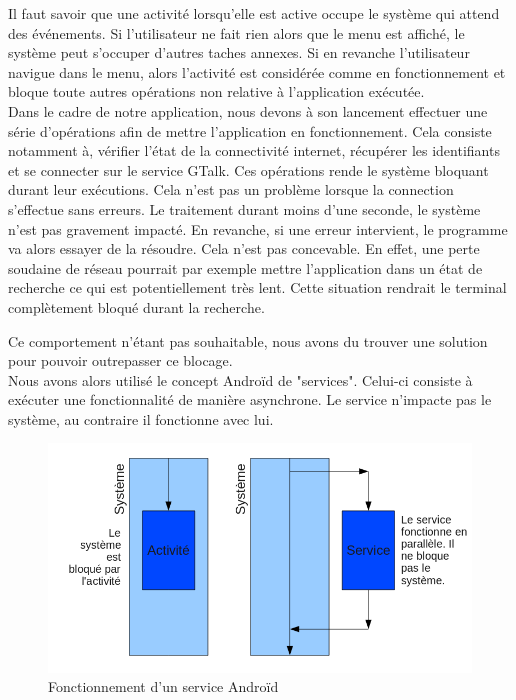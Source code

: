 Il faut savoir que une activité lorsqu'elle est active occupe le système qui attend des événements.
Si l'utilisateur ne fait rien alors que le menu est affiché, le système peut s'occuper d'autres 
taches annexes. Si en revanche l'utilisateur navigue dans le menu, alors l'activité est considérée
comme en fonctionnement et bloque toute autres opérations non relative à l'application exécutée.
\\


Dans le cadre de notre application, nous devons à son lancement effectuer une série d'opérations 
afin de mettre l'application en fonctionnement. Cela consiste notamment à, vérifier l'état de la 
connectivité internet, récupérer les identifiants et se connecter sur le service GTalk. Ces 
opérations rende le système bloquant durant leur exécutions. Cela n'est pas un problème lorsque la 
connection s'effectue sans erreurs. Le traitement durant moins d'une seconde, le système n'est pas
gravement impacté. En revanche, si une erreur intervient, le programme va alors essayer de la résoudre.
Cela n'est pas concevable. En effet, une perte soudaine de réseau pourrait par exemple mettre 
l'application dans un état de recherche ce qui est potentiellement très lent. Cette situation rendrait
le terminal complètement bloqué durant la recherche. 

Ce comportement n'étant pas souhaitable, nous avons du trouver une solution pour pouvoir outrepasser ce blocage.
\\


Nous avons alors utilisé le concept Androïd de "services". Celui-ci consiste à exécuter une fonctionnalité 
de manière asynchrone. Le service n'impacte pas le système, au contraire il fonctionne avec lui. 

\begin{figure}[!h]
	\center
	\includegraphics[width=13cm]{img/fonctionnement-des-services-android.png}
	\caption{Fonctionnement d'un service Androïd}
	\label{fonctionnement-des-services-android}
\end{figure}

